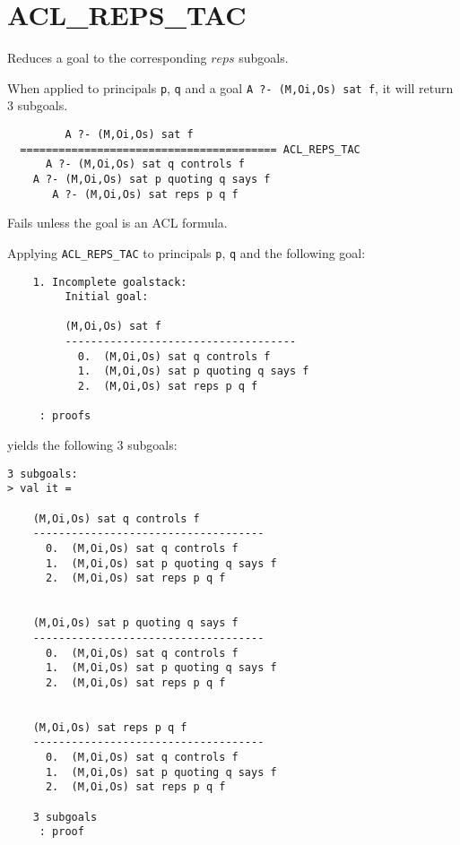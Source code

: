 \SEEALSO
\ENDDOC

\section{ACL\_REPS\_TAC}



\egroup


\SYNOPSIS
Reduces a goal to the corresponding $reps$ subgoals.

\DESCRIBE When applied to principals \texttt{p}, \texttt{q} and a goal \texttt{A ?- (M,Oi,Os) sat f}, it will return 3 subgoals.
\begin{verbatim}
         A ?- (M,Oi,Os) sat f
  ======================================== ACL_REPS_TAC
      A ?- (M,Oi,Os) sat q controls f
    A ?- (M,Oi,Os) sat p quoting q says f
       A ?- (M,Oi,Os) sat reps p q f
\end{verbatim}

\FAILURE 
Fails unless the goal is an ACL formula.

\EXAMPLE
Applying \texttt{ACL\_REPS\_TAC} to principals \texttt{p}, \texttt{q} and the following goal:
\begin{holboxed}
\begin{verbatim}
    1. Incomplete goalstack:
         Initial goal:
    
         (M,Oi,Os) sat f
         ------------------------------------
           0.  (M,Oi,Os) sat q controls f
           1.  (M,Oi,Os) sat p quoting q says f
           2.  (M,Oi,Os) sat reps p q f
    
     : proofs
\end{verbatim}
\end{holboxed}
yields the following 3 subgoals:
\begin{holboxed}
\begin{verbatim}
3 subgoals:
> val it =
    
    (M,Oi,Os) sat q controls f
    ------------------------------------
      0.  (M,Oi,Os) sat q controls f
      1.  (M,Oi,Os) sat p quoting q says f
      2.  (M,Oi,Os) sat reps p q f
    
    
    (M,Oi,Os) sat p quoting q says f
    ------------------------------------
      0.  (M,Oi,Os) sat q controls f
      1.  (M,Oi,Os) sat p quoting q says f
      2.  (M,Oi,Os) sat reps p q f
    
    
    (M,Oi,Os) sat reps p q f
    ------------------------------------
      0.  (M,Oi,Os) sat q controls f
      1.  (M,Oi,Os) sat p quoting q says f
      2.  (M,Oi,Os) sat reps p q f
    
    3 subgoals
     : proof
\end{verbatim}
\end{holboxed}

